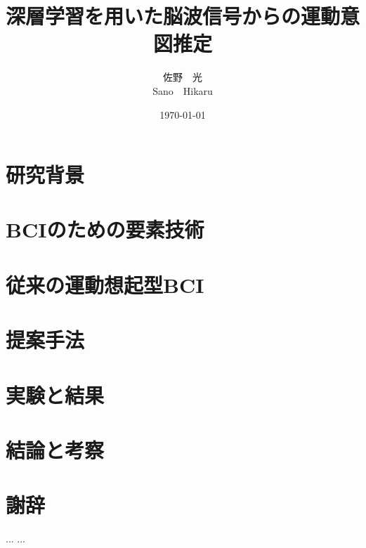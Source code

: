 \documentclass[a4paper,11pt,oneside,openany, report]{jsbook}
\title{深層学習を用いた脳波信号からの運動意図推定}
\author{佐野\ \ 光 \\ Sano\ \ Hikaru}
\date{\today}
\begin{document}
%


%
\maketitle
%
%
\frontmatter
% 
\setcounter{tocdepth}{2}
\tableofcontents
%
%
\mainmatter


\chapter{研究背景}


\chapter{BCIのための要素技術}





\chapter{従来の運動想起型BCI}



\chapter{提案手法}


\chapter{実験と結果}

\chapter{結論と考察}
%
%
\appendix
%

%
%
\chapter*{謝辞}
...
...
\end{document}

